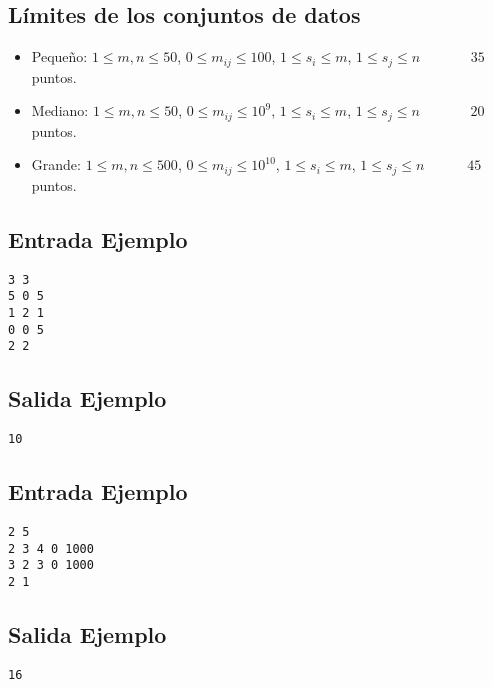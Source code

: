 \subsection*{Límites de los conjuntos de datos}

\begin{itemize}
    \item Pequeño: $1 \leq m, n \leq 50$, $0 \leq m_{ij} 
    \leq 100$, $1 \leq s_i \leq m$, $1 \leq s_j \leq n$
    $\quad \;\;\;\;\;\;\;$ $35$ puntos.
    \item Mediano: $1 \leq m, n \leq 50$, $0 \leq m_{ij} 
    \leq 10^9$, $1 \leq s_i \leq m$, $1 \leq s_j \leq n$
    $\quad \;\;\;\;\;\;\;$ $20$ puntos.
    \item Grande: $1 \leq m, n \leq 500$, $0 \leq m_{ij} 
    \leq 10^{10}$, $1 \leq s_i \leq m$, $1 \leq s_j \leq 
    n$    $\quad \;\;\;\;\;$ $45$ puntos.
\end{itemize}



\begin{multicols}{2}

\subsection*{Entrada Ejemplo}

\begin{verbatim}
3 3
5 0 5
1 2 1
0 0 5
2 2
\end{verbatim}

\columnbreak

\subsection*{Salida Ejemplo}

\begin{verbatim}
10
\end{verbatim}

\end{multicols}


\begin{multicols}{2}

\subsection*{Entrada Ejemplo}

\begin{verbatim}
2 5
2 3 4 0 1000
3 2 3 0 1000
2 1
\end{verbatim}

\columnbreak

\subsection*{Salida Ejemplo}

\begin{verbatim}
16
\end{verbatim}

\end{multicols}